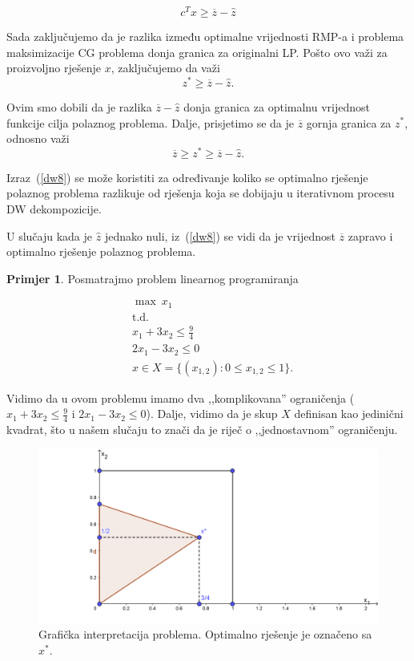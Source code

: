\documentclass[b5paper, utf8, 11pt, colorlinks]{book}
\theoremstyle{definition}
\newtheorem{primjer}{Primjer}[chapter]
\begin{document}
 $$ c^Tx\geqslant \overline{z}-\hat{z}$$
 
 Sada zaključujemo da je razlika između optimalne vrijednosti RMP-a i problema maksimizacije CG  problema donja granica za originalni LP. Pošto ovo važi za proizvoljno rješenje $x$, zaključujemo da važi 
 $$z^*\geqslant \overline{z}-\hat{z}.$$
 
 Ovim smo dobili da je razlika $\overline{z}-\hat{z}$ donja granica za optimalnu vrijednost funkcije cilja polaznog problema. Dalje, prisjetimo se da je $\overline{z}$ gornja granica za $z^*$, odnosno važi 
\begin{equation}\label{dw8}
	  \overline{z}\geqslant z^*\geqslant \overline{z}-\hat{z}.
\end{equation}
 
 Izraz~(\ref{dw8}) se može koristiti za određivanje koliko  se optimalno rješenje polaznog problema razlikuje od rješenja koja se dobijaju u iterativnom procesu DW dekompozicije.
 
 U slučaju kada je $\hat{z}$ jednako nuli, iz~(\ref{dw8}) se vidi da je vrijednost $\overline{z}$ zapravo i optimalno rješenje polaznog problema.
 
\begin{primjer}%
 
 Posmatrajmo problem linearnog programiranja
 \end{primjer}
   \begin{equation}
 	\begin{aligned}\label{primjer:dw1}
 		&\max\  x_1\\
 		&\mbox{t.d.}\\  
 		&x_1+3x_2\leqslant \frac94\\
 		 &2x_1-3x_2\leqslant 0\\
 		&x \in X=\{(x_{1,2}):0\leqslant x_{1, 2}  \leqslant 1\}.
 	\end{aligned}
 \end{equation}
 
 Vidimo da u ovom problemu imamo dva ,,komplikovana'' ograničenja ($x_1+3x_2\leqslant \frac94$ i
 $2x_1-3x_2\leqslant 0$). Dalje, vidimo da je skup $X$ definisan kao jedinični kvadrat, što u našem slučaju to znači da je riječ o ,,jednostavnom'' ograničenju. 
 
 \begin{figure}\label{fig:dw1}
 	\centering
 	\includegraphics[scale=4]{dw2.png}
 	\caption{Grafička interpretacija problema. Optimalno rješenje je označeno sa $x^*$. }
 	\label{fig:dw1}
 \end{figure}
 
\end{document}
